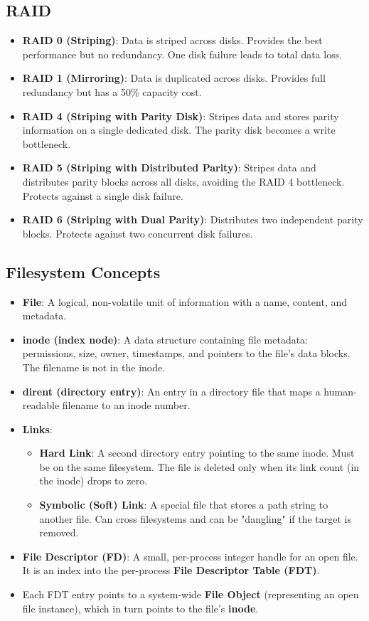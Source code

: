 \documentclass[8pt,a4paper]{article}
\begin{document}
\begin{multicols}{2}
\subsection*{RAID}
\begin{itemize}
    \item \textbf{RAID 0 (Striping)}: Data is striped across disks. Provides the best performance but no redundancy. One disk failure leads to total data loss.
    \item \textbf{RAID 1 (Mirroring)}: Data is duplicated across disks. Provides full redundancy but has a 50\% capacity cost.
    \item \textbf{RAID 4 (Striping with Parity Disk)}: Stripes data and stores parity information on a single dedicated disk. The parity disk becomes a write bottleneck.
    \item \textbf{RAID 5 (Striping with Distributed Parity)}: Stripes data and distributes parity blocks across all disks, avoiding the RAID 4 bottleneck. Protects against a single disk failure.
    \item \textbf{RAID 6 (Striping with Dual Parity)}: Distributes two independent parity blocks. Protects against two concurrent disk failures.
\end{itemize}

\subsection*{Filesystem Concepts}
\begin{itemize}
    \item \textbf{File}: A logical, non-volatile unit of information with a name, content, and metadata.
    \item \textbf{inode (index node)}: A data structure containing file metadata: permissions, size, owner, timestamps, and pointers to the file's data blocks. The filename is not in the inode.
    \item \textbf{dirent (directory entry)}: An entry in a directory file that maps a human-readable filename to an inode number.
    \item \textbf{Links}:
        \begin{itemize}
            \item \textbf{Hard Link}: A second directory entry pointing to the same inode. Must be on the same filesystem. The file is deleted only when its link count (in the inode) drops to zero.
            \item \textbf{Symbolic (Soft) Link}: A special file that stores a path string to another file. Can cross filesystems and can be "dangling" if the target is removed.
        \end{itemize}
    \item \textbf{File Descriptor (FD)}: A small, per-process integer handle for an open file. It is an index into the per-process \textbf{File Descriptor Table (FDT)}.
    \item Each FDT entry points to a system-wide \textbf{File Object} (representing an open file instance), which in turn points to the file's \textbf{inode}.
\end{itemize}


\end{multicols}
\end{document}
